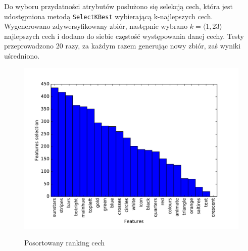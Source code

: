 Do wyboru przydatności atrybutów posłużono się selekcją cech, która jest udostępniona metodą \texttt{SelectKBest} wybierającą k-najlepszych cech. Wygenerowano zdywersyfikowany zbiór, następnie wybrano $k=\langle1, 23\rangle$ najlepszych cech i dodano do siebie częstość występowania danej cechy. Testy przeprowadzono 20 razy, za każdym razem generując nowy zbiór, zaś wyniki uśredniono.

\begin{table}[ht!]
\centering
\caption{Selekcja cech 1/2}
\label{selection1}
\end{table}

\begin{table}[ht!]
\centering
\caption{Selekcja cech 2/2}
\label{selection2}
\end{table}

\begin{figure}[h!]
	\centering
	\includegraphics[width=0.95\linewidth]{features.pdf}
	\label{features}
	\caption{Posortowany ranking cech}
\end{figure}


